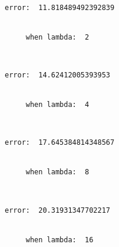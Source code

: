 \documentclass[11pt]{article}
\begin{document}
    \begin{Verbatim}[commandchars=\\\{\}]
     error:  11.818489492392839


     when lambda:  2

    \end{Verbatim}

    \begin{center}
    \end{center}
    { \hspace*{\fill} \\}
    
    \begin{Verbatim}[commandchars=\\\{\}]
     error:  14.62412005393953


     when lambda:  4

    \end{Verbatim}

    \begin{center}
    \end{center}
    { \hspace*{\fill} \\}
    
    \begin{Verbatim}[commandchars=\\\{\}]
     error:  17.645384814348567


     when lambda:  8

    \end{Verbatim}

    \begin{center}
    \end{center}
    { \hspace*{\fill} \\}
    
    \begin{Verbatim}[commandchars=\\\{\}]
     error:  20.31931347702217


     when lambda:  16

    \end{Verbatim}

    \begin{center}
    \end{center}
    { \hspace*{\fill} \\}
    
\end{document}
